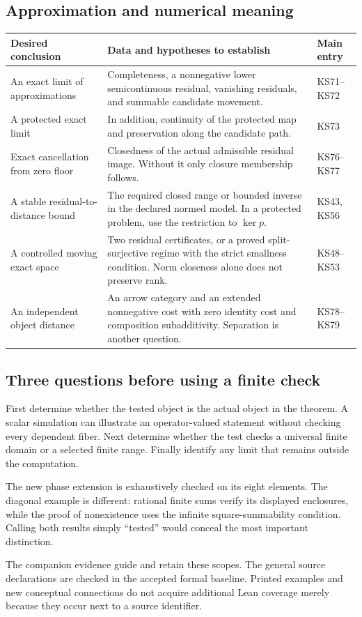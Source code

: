 \subsection{Approximation and numerical meaning}
\begin{longtable}{@{}p{.24\linewidth}p{.48\linewidth}p{.21\linewidth}@{}}
\toprule Desired conclusion & Data and hypotheses to establish & Main entry\\\midrule\endhead
An exact limit of approximations & Completeness, a nonnegative lower semicontinuous residual, vanishing residuals, and summable candidate movement. & KS71--KS72\\[4pt]
A protected exact limit & In addition, continuity of the protected map and preservation along the candidate path. & KS73\\[4pt]
Exact cancellation from zero floor & Closedness of the actual admissible residual image. Without it only closure membership follows. & KS76--KS77\\[4pt]
A stable residual-to-distance bound & The required closed range or bounded inverse in the declared normed model. In a protected problem, use the restriction to $\ker p$. & KS43, KS56\\[4pt]
A controlled moving exact space & Two residual certificates, or a proved split-surjective regime with the strict smallness condition. Norm closeness alone does not preserve rank. & KS48--KS53\\[4pt]
An independent object distance & An arrow category and an extended nonnegative cost with zero identity cost and composition subadditivity. Separation is another question. & KS78--KS79\\
\bottomrule
\end{longtable}

\subsection{Three questions before using a finite check}
First determine whether the tested object is the actual object in the theorem. A scalar simulation can illustrate an operator-valued statement without checking every dependent fiber. Next determine whether the test checks a universal finite domain or a selected finite range. Finally identify any limit that remains outside the computation.

The new phase extension is exhaustively checked on its eight elements. The diagonal example is different: rational finite sums verify its displayed enclosures, while the proof of nonexistence uses the infinite square-summability condition. Calling both results simply ``tested'' would conceal the most important distinction.

The companion evidence guide and  retain these scopes. The general source declarations are checked in the accepted formal baseline. Printed examples and new conceptual connections do not acquire additional Lean coverage merely because they occur next to a source identifier.
